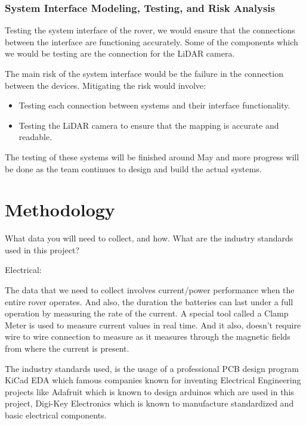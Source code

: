 \documentclass[a4paper, 10pt]{article}
\begin{document}
		\subsubsection{System Interface Modeling, Testing, and Risk Analysis}
Testing the system interface of the rover, we would ensure that the connections between the interface are functioning accurately. Some of the components which we would be testing are the connection for the LiDAR camera. 

The main risk of the system interface would be the failure in the connection between the devices. Mitigating the risk would involve:

\begin{itemize}
\item
Testing each connection between systems and their interface functionality.

\item
Testing the LiDAR camera to ensure that the mapping is accurate and readable. 
\end{itemize}

The testing of these systems will be finished around May and more progress will be done as the team continues to design and build the actual systems.

\section{Methodology}

What data you will need to collect, and how. 
What are the industry standards used in this project? 

Electrical:

The data that we need to collect involves current/power performance when the entire rover operates. And also, the duration the batteries can last under a full operation by measuring the rate of the current. A special tool called a Clamp Meter is used to measure current values in real time. And it also, doesn't require wire to wire connection to measure as it measures through the magnetic fields from where the current is present. 

The industry standards used, is the usage of a professional PCB design program KiCad EDA which famous companies known for inventing Electrical Engineering projects like Adafruit which is known to design arduinos which are used in this project, Digi-Key Electronics which is known to manufacture standardized and basic electrical components. 
\end{document}
